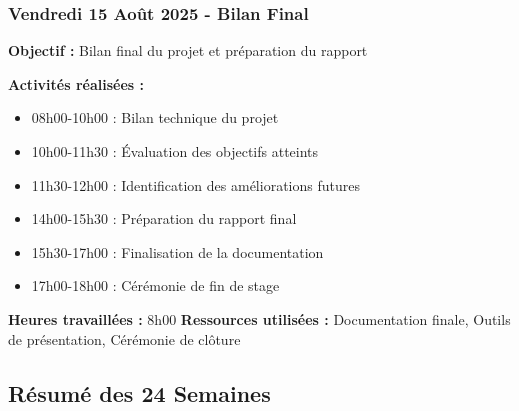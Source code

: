 \subsubsection{Vendredi 15 Août 2025 - Bilan Final}
\textbf{Objectif :} Bilan final du projet et préparation du rapport

\textbf{Activités réalisées :}
\begin{itemize}
    \item 08h00-10h00 : Bilan technique du projet
    \item 10h00-11h30 : Évaluation des objectifs atteints
    \item 11h30-12h00 : Identification des améliorations futures
    \item 14h00-15h30 : Préparation du rapport final
    \item 15h30-17h00 : Finalisation de la documentation
    \item 17h00-18h00 : Cérémonie de fin de stage
\end{itemize}

\textbf{Heures travaillées :} 8h00
\textbf{Ressources utilisées :} Documentation finale, Outils de présentation, Cérémonie de clôture

\subsection{Résumé des 24 Semaines}

